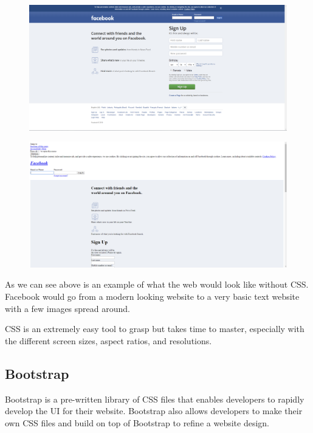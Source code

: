 \begin{figure}[H]
    \centering
    \begin{minipage}{.50\textwidth}
      \centering
      \includegraphics[width=.9\linewidth]{img/facebookCSS.PNG}
      \label{fig:aboutPC}
    \end{minipage}%
    \begin{minipage}{.50\textwidth}
      \centering
      \includegraphics[width=.9\linewidth]{img/facebookNoCSS.PNG}
      \label{fig:aboutMobile}
    \end{minipage}
\end{figure}

As we can see above is an example of what the web would look like without CSS. Facebook would go from a modern looking website to a very basic text website with a few images spread around.

CSS is an extremely easy tool to grasp but takes time to master, especially with the different screen sizes, aspect ratios, and resolutions.

\subsection{Bootstrap}
Bootstrap is a pre-written library of CSS files that enables developers to rapidly develop the UI for their website. Bootstrap also allows developers to make their own CSS files and build on top of Bootstrap to refine a website design.

